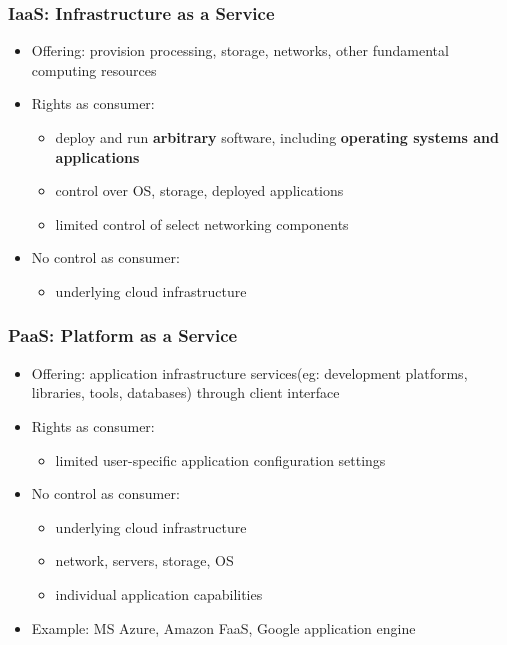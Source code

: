 \subsubsection{IaaS: Infrastructure as a Service}
\begin{itemize}
	\item Offering: provision processing, storage, networks, other fundamental computing resources
	\item Rights as consumer: 
	\begin{itemize}
		\item deploy and run \textbf{arbitrary} software, including \textbf{operating systems and applications}
		\item control over OS, storage, deployed applications
		\item limited control of select networking components
	\end{itemize}
	\item No control as consumer:
	\begin{itemize}
		\item underlying cloud infrastructure
	\end{itemize}
	
	
\end{itemize}
\subsubsection{PaaS: Platform as a Service}
\begin{itemize}
	\item Offering: application infrastructure services(eg: development platforms, libraries, tools, databases) through client interface
	\item Rights as consumer:
	\begin{itemize}
		\item limited user-specific application configuration settings
	\end{itemize}
	\item No control as consumer:
	\begin{itemize}
		\item underlying cloud infrastructure
		\item network, servers, storage, OS
		\item individual application capabilities
	\end{itemize}
	\item Example: MS Azure, Amazon FaaS, Google application engine
\end{itemize}
